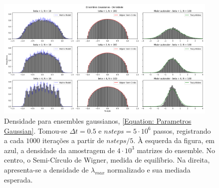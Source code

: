 \begin{figure}[ht!]
	\centering
	\includegraphics[width=0.95\textwidth]{Assets/validationGaussianTracy.png}
	\caption{Densidade para ensembles gaussianos, \ref{Equation: Parametros Gaussian}. Tomou-se $\Delta t = 0.5$ e $nsteps = 5\cdot10^6$ passos, registrando a cada $1000$ iterações a partir de $nsteps/5$. À esquerda da figura, em azul, a densidade da amostragem de $4\cdot10^3$ matrizes do ensemble. No centro, o Semi-Círculo de Wigner, medida de equilíbrio. Na direita, apresenta-se a densidade de $\lambda_{max}$ normalizado e sua mediada esperada.}
	\label{Figura: Gaussian}
\end{figure}

